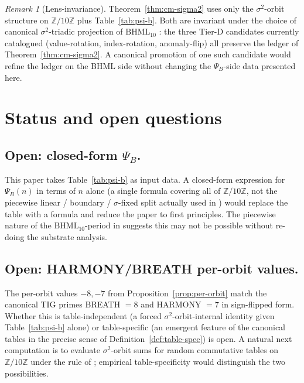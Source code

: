 \documentclass[11pt,reqno]{amsart}
\theoremstyle{plain}
\theoremstyle{definition}
\theoremstyle{remark}
\newtheorem*{remark}{Remark}
\newcommand{\Z}{\mathbb{Z}}
\newcommand{\BH}{\mathrm{BHML}}
\newcommand{\sig}{\sigma}
\begin{document}
\begin{remark}[Lens-invariance]
Theorem~\ref{thm:cm-sigma2} uses only the $\sig^{2}$-orbit structure on
$\Z/10\Z$ plus Table~\ref{tab:psi-b}.  Both are invariant under the
choice of canonical $\sig^{2}$-triadic projection of $\BH_{10}$
\cite{Atlas2026Tiering}: the three Tier-D candidates currently
catalogued (value-rotation, index-rotation, anomaly-flip) all preserve
the ledger of Theorem~\ref{thm:cm-sigma2}.  A canonical promotion of
one such candidate would refine the ledger on the BHML side without
changing the $\Psi_B$-side data presented here.
\end{remark}

\section{Status and open questions}
\label{sec:open}

\subsection{Open: closed-form $\Psi_B$.}
This paper takes Table~\ref{tab:psi-b} as input data.  A closed-form
expression for $\Psi_B(n)$ in terms of $n$ alone (a single formula
covering all of $\Z/10\Z$, not the piecewise linear / boundary /
$\sig$-fixed split actually used in \cite{SandersBridgeWP9}) would
replace the table with a formula and reduce the paper to first
principles.  The piecewise nature of the $\BH_{10}$-period in
\cite{SandersBridgeWP9} suggests this may not be possible without
re-doing the substrate analysis.

\subsection{Open: HARMONY/BREATH per-orbit values.}
The per-orbit values $-8, -7$ from Proposition~\ref{prop:per-orbit}
match the canonical TIG primes BREATH $= 8$ and HARMONY $= 7$ in
sign-flipped form.  Whether this is table-independent (a forced
$\sig^{2}$-orbit-internal identity given Table~\ref{tab:psi-b}
alone) or table-specific (an emergent feature of the canonical tables
in the precise sense of Definition~\ref{def:table-spec}) is open.
A natural next computation is to evaluate $\sig^{2}$-orbit sums for
random commutative tables on $\Z/10\Z$ under the rule of
\cite[\S 5]{SandersBridgeWP9}; empirical
table-specificity would distinguish the two possibilities.
\end{document}
